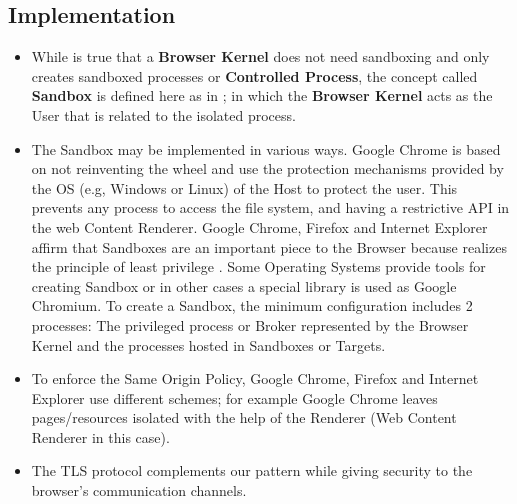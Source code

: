\documentclass{sig-alternate-05-2015}
\begin{document}
  \subsection*{Implementation}
  \begin{itemize}
    \item While is true that a \textbf{Browser Kernel} does not need sandboxing and only creates sandboxed processes or \textbf{Controlled Process}, the concept called \textbf{Sandbox} is defined here as in \cite{fernandez2013security}; in which the \textbf{Browser Kernel} acts as the User that is related to the isolated process.
    \item The Sandbox may be implemented in various ways. Google Chrome \cite{sandboxGC} is based on not reinventing the wheel and use the protection mechanisms provided by the OS (e.g, Windows or Linux) of the Host to protect the user. This prevents any process to access the file system, and having a restrictive API in the web Content Renderer. Google Chrome, Firefox and Internet Explorer affirm that Sandboxes are an important piece to the Browser because realizes the principle of least privilege \cite{Yason,sandboxGC,sandboxFirefox}. Some Operating Systems provide tools for creating Sandbox or in other cases a special library is used as Google Chromium. To create a Sandbox, the minimum configuration includes 2 processes: The privileged process or Broker represented by the Browser Kernel and the processes hosted in Sandboxes or Targets.
    \item To enforce the Same Origin Policy, Google Chrome, Firefox and Internet Explorer use different schemes; for example Google Chrome leaves pages/resources isolated with the help of the Renderer (Web Content Renderer in this case).
    \item The TLS protocol complements our pattern while giving security to the browser's communication channels.
  \end{itemize}
\end{document}
